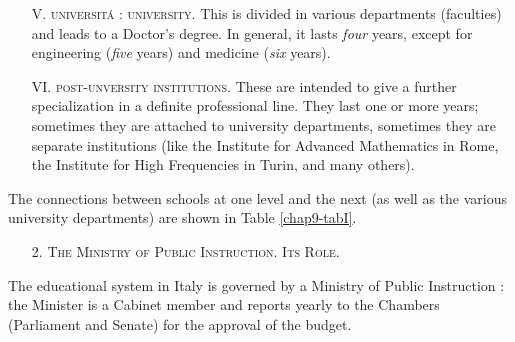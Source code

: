\begin{itemize}
\item[V.] \textsc{universit\'a : university.} This is divided in various departments (faculties) and leads to a Doctor's degree. In general, it lasts {\em four} years, except for engineering ({\em five} years) and medicine ({\em six} years).

\item[VI.] \textsc{post-unversity institutions.} These are intended to give a further specialization in a definite professional line. They last one or more years; sometimes they are attached to university departments, sometimes they are separate institutions (like the Institute for Advanced Mathematics in Rome, the Institute for High Frequencies in Turin, and many others).
\end{itemize}

The connections between schools at one level and the next (as well as the various university departments) are shown in Table \ref{chap9-tabI}.

\begin{itemize}
\item[2.] \textsc{The Ministry of Public Instruction. Its Role.}
\end{itemize}

The educational system in Italy is governed by a Ministry of Public Instruction : the Minister is a Cabinet member and reports yearly to the Chambers (Parliament and Senate) for the approval of the budget.

